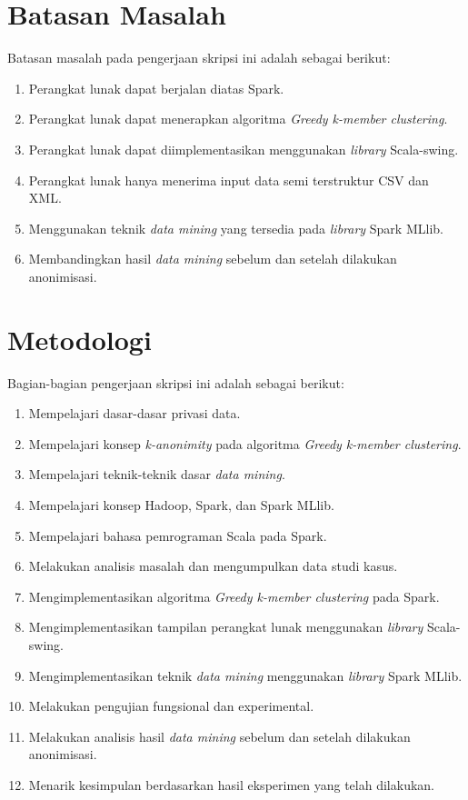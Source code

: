 \section{Batasan Masalah}
\label{sec:batasan}
Batasan masalah pada pengerjaan skripsi ini adalah sebagai berikut:
\begin{enumerate}
\item Perangkat lunak dapat berjalan diatas Spark.
\item Perangkat lunak dapat menerapkan algoritma {\it Greedy k-member clustering}.
\item Perangkat lunak dapat diimplementasikan menggunakan {\it library} Scala-swing.
\item Perangkat lunak hanya menerima input data semi terstruktur CSV dan XML.
\item Menggunakan teknik {\it data mining} yang tersedia pada {\it library} Spark MLlib.
\item Membandingkan hasil {\it data mining} sebelum dan setelah dilakukan anonimisasi.
\end{enumerate}

\section{Metodologi}
\label{sec:metlit}
Bagian-bagian pengerjaan skripsi ini adalah sebagai berikut:
\begin{enumerate}
\item Mempelajari dasar-dasar privasi data.
\item Mempelajari konsep {\it k-anonimity} pada algoritma {\it Greedy k-member clustering}.
\item Mempelajari teknik-teknik dasar {\it data mining}.
\item Mempelajari konsep Hadoop, Spark, dan Spark MLlib.
\item Mempelajari bahasa pemrograman Scala pada Spark.
\item Melakukan analisis masalah dan mengumpulkan data studi kasus.
\item Mengimplementasikan algoritma {\it Greedy k-member clustering } pada Spark.
\item Mengimplementasikan tampilan perangkat lunak menggunakan {\it library} Scala-swing.
\item Mengimplementasikan teknik {\it data mining} menggunakan {\it library} Spark MLlib.
\item Melakukan pengujian fungsional dan experimental.
\item Melakukan analisis hasil {\it data mining} sebelum dan setelah dilakukan anonimisasi.
\item Menarik kesimpulan berdasarkan hasil eksperimen yang telah dilakukan.
\end{enumerate}

